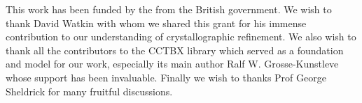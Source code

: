 \documentclass[pdf]{iucr}
\begin{document}

This work has been funded by the \ourEPSRCgrant from the British government. We wish to thank David Watkin with whom we shared this grant for his immense contribution to our understanding of crystallographic refinement. We also wish to thank all the contributors to the CCTBX library which served as a foundation and model for our work, especially its main author Ralf W. Grosse-Kunstleve whose support has been invaluable. Finally we wish to thanks Prof George Sheldrick for many fruitful discussions.

\end{document}
